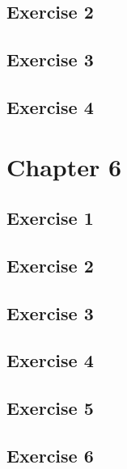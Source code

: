 \documentclass[a4paper,12pt,oneside]{book}
\begin{document}
\hypertarget{exercise-2-2}{%
\subsection{Exercise 2}\label{exercise-2-2}}

\hypertarget{exercise-3-2}{%
\subsection{Exercise 3}\label{exercise-3-2}}

\hypertarget{exercise-4-1}{%
\subsection{Exercise 4}\label{exercise-4-1}}

\hypertarget{chapter-6}{%
\section{Chapter 6}\label{chapter-6}}

\hypertarget{exercise-1-3}{%
\subsection{Exercise 1}\label{exercise-1-3}}

\hypertarget{exercise-2-3}{%
\subsection{Exercise 2}\label{exercise-2-3}}

\hypertarget{exercise-3-3}{%
\subsection{Exercise 3}\label{exercise-3-3}}

\hypertarget{exercise-4-2}{%
\subsection{Exercise 4}\label{exercise-4-2}}

\hypertarget{exercise-5-1}{%
\subsection{Exercise 5}\label{exercise-5-1}}

\hypertarget{exercise-6}{%
\subsection{Exercise 6}\label{exercise-6}}
\end{document}
